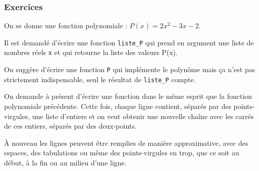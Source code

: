 \subsubsection[Exercices]{Exercices}
\label{subsub:XI.4.1.2}

\begin{exercise}[title={Fonction polynomiale}, level=basic]
On se donne une fonction polynomiale :
$P(x) = 2x^2 - 3x - 2$.

Il est demandé d'écrire une fonction \texttt{liste\_P} qui prend en argument une liste de nombres réels \texttt{x} et qui retourne la liste des valeurs P(x).

On suggère d'écrire une fonction \texttt{P} qui implémente le polynôme mais ça n'est pas strictement indispensable, seul le résultat de \texttt{liste\_P} compte.
\end{exercise}

\begin{exercise}[title={Mise au carré}, level=intermediate]
On demande à présent d'écrire une fonction dans le même esprit que la fonction polynomiale précédente. Cette fois, chaque ligne contient, séparés par des points-virgules, une liste d'entiers et on veut obtenir une nouvelle chaîne avec les carrés de ces entiers, séparés par des deux-points.

À nouveau les lignes peuvent être remplies de manière approximative, avec des espaces, des tabulations ou même des points-virgules en trop, que ce soit au début, à la fin ou au milieu d'une ligne.
\end{exercise}


